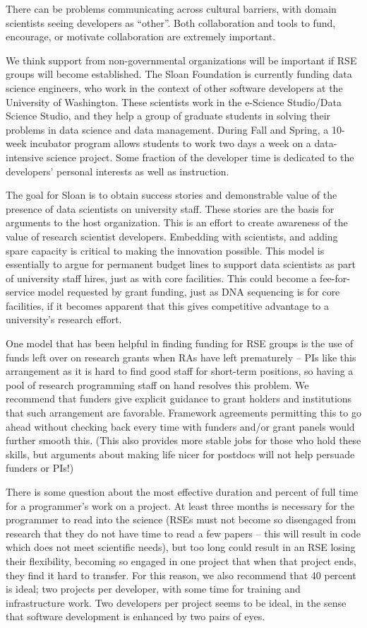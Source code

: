 There can be problems communicating across cultural barriers, with domain
scientists seeing developers as ``other''. Both collaboration and tools to fund,
encourage, or motivate collaboration are extremely important. 

We think support from non-governmental organizations will be important if RSE
groups will become established. The Sloan Foundation is currently funding data
science engineers, who work in the context of other software developers at the University
of Washington. These scientists work in the e-Science Studio/Data Science
Studio, and they help a group of graduate students in solving their problems in
data science and data management. During Fall and Spring, a 10-week incubator
program allows students to work two days a week on a data-intensive
science project. Some fraction of the developer time is dedicated to the
developers' personal interests as well as instruction.

The goal for Sloan is to obtain success stories and demonstrable value
of the presence of data scientists on university staff. These stories are the
basis for arguments to the host organization. This is an effort to create
awareness of the value of research scientist developers. Embedding with
scientists, and adding spare capacity is critical to making the innovation
possible. This model is essentially to argue for permanent budget lines to
support data scientists as part of university staff hires, just as with core
facilities. This could become a fee-for-service model requested by grant
funding, just as DNA sequencing is for core facilities, if it becomes apparent
that this gives competitive advantage to a university's research effort.

One model that has been helpful in finding funding for RSE groups is the use of
funds left over on research grants when RAs have left prematurely -- PIs like
this arrangement as it is hard to find good staff for short-term positions, so
having a pool of research programming staff on hand resolves this problem. We
recommend that funders give explicit guidance to grant holders and institutions
that such arrangement are favorable. Framework agreements permitting this to go
ahead without checking back every time with funders and/or grant panels would
further smooth this. (This also provides more stable jobs for those who hold
these skills, but arguments about making life nicer for postdocs will not help
persuade funders or PIs!)

There is some question about the most effective duration and percent of full
time for a programmer's work on a project. At least three months is necessary
for the programmer to read into the science (RSEs must not become so disengaged
from research that they do not have time to read a few papers -- this will result
in code which does not meet scientific needs), but too long could result in an
RSE losing their flexibility, becoming so engaged in one project that when that
project ends, they find it hard to transfer. For this reason, we also recommend
that 40 percent is ideal; two projects per developer, with some time for
training and infrastructure work. Two developers per project seems to be ideal,
in the sense that software development is enhanced by two pairs of eyes.

